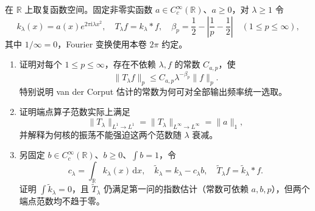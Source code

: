 \begin{optionalexercise}[振荡卷积的内部指数与端点障碍]\label{b2:ex:25-oscillatory-convolution-endpoints}
在 \(\mathbb R\) 上取复函数空间。固定非零实函数 \(a\in C_c^\infty(\mathbb R)\)、\(a\geq0\)，对 \(\lambda\geq1\) 令
\[
 k_\lambda(x)=a(x)e^{2\pi\mathrm i\lambda x^2},\quad
 T_\lambda f=k_\lambda*f,
 \quad
 \beta_p=\frac12-\left|\frac1p-\frac12\right|\quad(1\leq p\leq\infty),
\]
其中 \(1/\infty=0\)，Fourier 变换使用本卷 \(2\pi\) 约定。
\begin{enumerate}
\item\label{b2:item:25-oscillatory-interior}证明对每个 \(1\leq p\leq\infty\)，存在不依赖 \(\lambda,f\) 的常数 \(C_{a,p}\)，使
\[
 \|T_\lambda f\|_p\leq C_{a,p}\lambda^{-\beta_p}\|f\|_p.
\]
特别说明 van der Corput 估计的常数为何可对全部输出频率统一选取。
\item\label{b2:item:25-oscillatory-endpoints}证明端点算子范数实际上满足
\[
 \|T_\lambda\|_{L^1\to L^1}
 =\|T_\lambda\|_{L^\infty\to L^\infty}=\|a\|_1,
\]
并解释为何核的振荡不能强迫这两个范数随 \(\lambda\) 衰减。
\item\label{b2:item:25-oscillatory-cancellation}另固定 \(b\in C_c^\infty(\mathbb R)\)、\(b\geq0\)、\(\int b=1\)，令
\[
 c_\lambda=\int_{\mathbb R}k_\lambda(x)\,\mathrm dx,\quad
 \widetilde k_\lambda=k_\lambda-c_\lambda b,\quad
 \widetilde T_\lambda f=\widetilde k_\lambda*f.
\]
证明 \(\int\widetilde k_\lambda=0\)，且 \(\widetilde T_\lambda\) 仍满足第一问的指数估计（常数可依赖 \(a,b,p\)），但两个端点范数均不趋于零。
\end{enumerate}
\end{optionalexercise}
